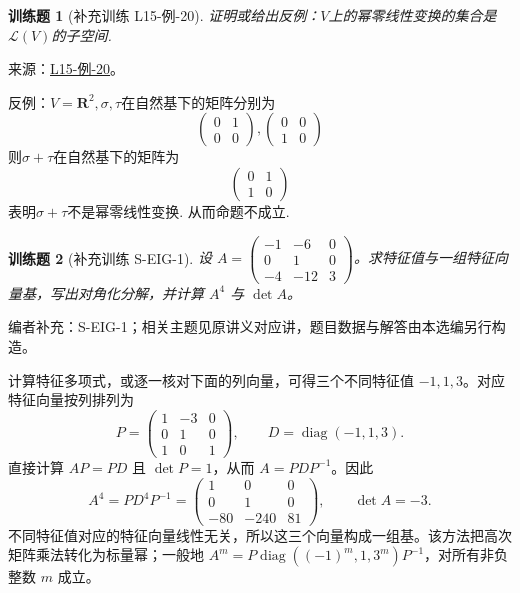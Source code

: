 \documentclass[12pt,fontset=fandol]{ctexart}
\newtheorem{exercise}{训练题}[section]
\begin{document}
\begin{exercise}[补充训练 L15-例-20]\label{prob:L15-例-20}
证明或给出反例：$V$上的幂零线性变换的集合是$\mathcal{L}(V)$的子空间.
\end{exercise}
\noindent 来源：\href{https://github.com/yhwu-is/Linear-Algebra-Left-Undone/blob/new/%E8%AE%B2%E4%B9%89/%E4%B8%93%E9%A2%98/15%20%E7%9B%B8%E4%BC%BC%E6%A0%87%E5%87%86%E5%BD%A2%EF%BC%9A%E5%A4%8D%E6%95%B0%E5%9F%9F%E4%B8%8A%E7%9A%84%E5%B0%9D%E8%AF%95%E4%B8%8E%E7%90%86%E8%AE%BA.tex}{L15-例-20}。
\begin{solve}
反例：$V=\mathbf{R}^2,\sigma,\tau$在自然基下的矩阵分别为
            \[ \begin{pmatrix}
                0 & 1 \\
                0 & 0
            \end{pmatrix},
            \begin{pmatrix}
                0 & 0 \\
                1 & 0
            \end{pmatrix}\]
            则$\sigma+\tau$在自然基下的矩阵为
            \[ \begin{pmatrix}
                0 & 1 \\
                1 & 0
            \end{pmatrix} \]
            表明$\sigma+\tau$不是幂零线性变换. 从而命题不成立.
\end{solve}

\begin{exercise}[补充训练 S-EIG-1]\label{prob:S-EIG-1}
设 $A=\begin{pmatrix}-1&-6&0\\0&1&0\\-4&-12&3\end{pmatrix}$。求特征值与一组特征向量基，写出对角化分解，并计算 $A^4$ 与 $\det A$。
\end{exercise}
\noindent 编者补充：S-EIG-1；相关主题见原讲义对应讲，题目数据与解答由本选编另行构造。
\begin{solve}
计算特征多项式，或逐一核对下面的列向量，可得三个不同特征值 $-1,1,3$。对应特征向量按列排列为
\[P=\begin{pmatrix}1&-3&0\\0&1&0\\1&0&1\end{pmatrix},\qquad D=\operatorname{diag}(-1,1,3).\]
直接计算 $AP=PD$ 且 $\det P=1$，从而 $A=PDP^{-1}$。因此
\[A^4=PD^4P^{-1}=\begin{pmatrix}1&0&0\\0&1&0\\-80&-240&81\end{pmatrix},\qquad \det A=-3.\]
不同特征值对应的特征向量线性无关，所以这三个向量构成一组基。该方法把高次矩阵乘法转化为标量幂；一般地 $A^m=P\operatorname{diag}((-1)^m,1,3^m)P^{-1}$，对所有非负整数 $m$ 成立。
\end{solve}
\end{document}
